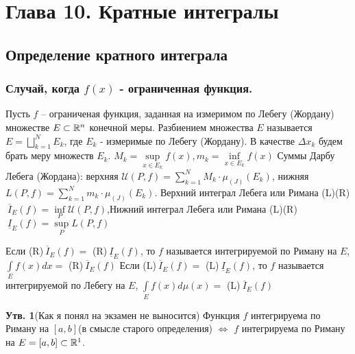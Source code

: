 \setcounter{section}{9}
\section{Глава 10. Кратные интегралы}
\subsection{Определение кратного интеграла}
\subsubsection{Случай, когда $f(x)$ - ограниченная функция.}
\begin{Def}
Пусть $f$ -- ограниченая функция, заданная на измеримом по Лебегу (Жордану) множестве $E \subset \mathbb{R}^n$ конечной меры. $\textbf{Разбиением}$ множества $E$ называется $E=\bigsqcup\limits_{k=1}^N E_k$, где $E_k$ - измеримые по Лебегу (Жордану). \newline В качестве $\Delta x_k$ будем брать меру множеств $E_k$. $M_k=\sup\limits_{x\in E_k} f(x), m_k=\inf\limits_{x\in E_k}f(x)$ \newline
Суммы Дарбу Лебега (Жордана): верхняя $\mathcal{U}(P, f)=\sum\limits_{k=1}^N M_k \cdot \mu_{(J)}(E_k)$, нижняя $L(P, f)=\sum\limits_{k=1}^N m_k \cdot \mu_{(J)}(E_k)$.
\newline Верхний интеграл Лебега или Римана (L)(R)$\ \overline{I}_E(f)=\inf\limits_P \mathcal{U}(P, f)$,\newline Нижний интеграл Лебега или Римана (L)(R)$\ \underline{I}_E(f)=\sup\limits_P L(P, f)$
\end{Def}
\begin{Def}
Если (R)$\ \overline{I}_E(f)=$ (R)$\ \underline{I}_E(f)$, то $f$ называется интегрируемой по Риману на $E$, $\int\limits_E f(x)dx=$ (R)$\ \overline{I}_E(f)$ \newline
Если (L)$\ \overline{I}_E(f)=$ (L)$\ \underline{I}_E(f)$, то $f$ называется интегрируемой по Лебегу на $E$, $\int\limits_E f(x)d\mu (x)=$ (L)$\ \overline{I}_E(f)$
\end{Def}
\textbf{Утв. 1}(Как я понял на экзамен не выносится) Функция $f$ интегрируема по Риману на $[a,b]$(в смысле старого определения) $\Leftrightarrow$ $f$ интегрируема по Риману на $E=[a,b] \subset \mathbb{R}^1$.
